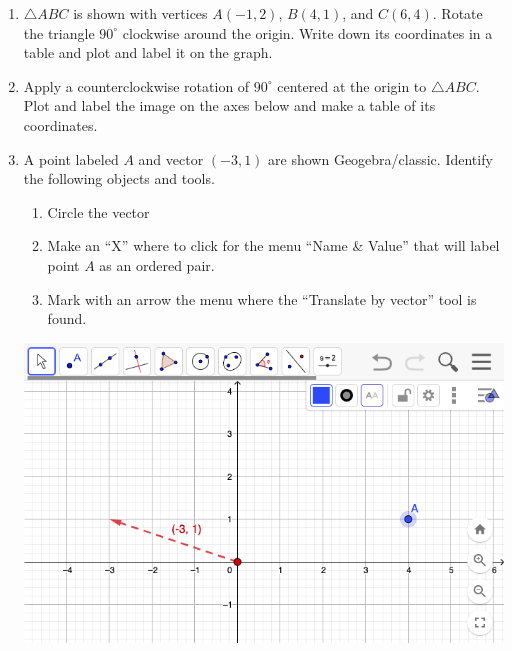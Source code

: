 \begin{enumerate}
\item $\triangle ABC$ is shown with vertices $A(-1,2)$, $B(4,1)$, and $C(6,4)$. Rotate the triangle $90^\circ$ clockwise around the origin. Write down its coordinates in a table and plot and label it on the graph.
\begin{flushright}
  \end{flushright}

\item Apply a counterclockwise rotation of $90^\circ$ centered at the origin to $\triangle ABC$. Plot and label the image on the axes below and make a table of its coordinates.
  \begin{flushright}
  \end{flushright}

\item A point labeled $A$ and vector $(-3,1)$ are shown Geogebra/classic. Identify the following objects and tools.
\begin{enumerate}
  \item Circle the vector
  \item Make an ``X'' where to click for the menu ``Name \& Value'' that will label point $A$ as an ordered pair.
  \item Mark with an arrow the menu where the ``Translate by vector'' tool is found.
\end{enumerate}
\begin{flushright}
  \includegraphics[width=6.25in]{../graphics/08Geogebra_toolbar.png}
\end{flushright}


\end{enumerate}
